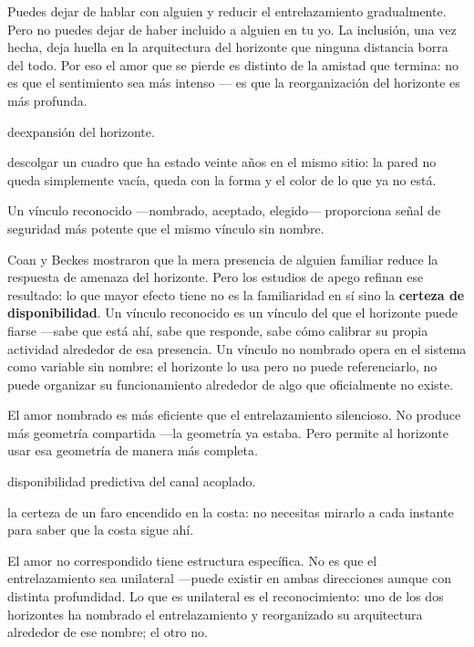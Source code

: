 Puedes dejar de hablar con alguien y reducir el entrelazamiento gradualmente. Pero no puedes dejar de haber incluido a alguien en tu yo. La inclusión, una vez hecha, deja huella en la arquitectura del horizonte que ninguna distancia borra del todo. Por eso el amor que se pierde es distinto de la amistad que termina: no es que el sentimiento sea más intenso — es que la reorganización del horizonte es más profunda.

\begin{fisica}
 deexpansión del horizonte.

 descolgar un cuadro que ha estado veinte años en el mismo sitio: la pared no queda simplemente vacía, queda con la forma y el color de lo que ya no está.
\end{fisica}
\noindent Un vínculo reconocido —nombrado, aceptado, elegido— proporciona señal de seguridad más potente que el mismo vínculo sin nombre.

Coan y Beckes mostraron que la mera presencia de alguien familiar reduce la respuesta de amenaza del horizonte. Pero los estudios de apego refinan ese resultado: lo que mayor efecto tiene no es la familiaridad en sí sino la \textbf{certeza de disponibilidad}. Un vínculo reconocido es un vínculo del que el horizonte puede fiarse —sabe que está ahí, sabe que responde, sabe cómo calibrar su propia actividad alrededor de esa presencia. Un vínculo no nombrado opera en el sistema como variable sin nombre: el horizonte lo usa pero no puede referenciarlo, no puede organizar su funcionamiento alrededor de algo que oficialmente no existe.

El amor nombrado es más eficiente que el entrelazamiento silencioso. No produce más geometría compartida —la geometría ya estaba. Pero permite al horizonte usar esa geometría de manera más completa.

\begin{fisica}
 disponibilidad predictiva del canal acoplado.

 la certeza de un faro encendido en la costa: no necesitas mirarlo a cada instante para saber que la costa sigue ahí.
\end{fisica}
\noindent El amor no correspondido tiene estructura específica. No es que el entrelazamiento sea unilateral —puede existir en ambas direcciones aunque con distinta profundidad. Lo que es unilateral es el reconocimiento: uno de los dos horizontes ha nombrado el entrelazamiento y reorganizado su arquitectura alrededor de ese nombre; el otro no.

